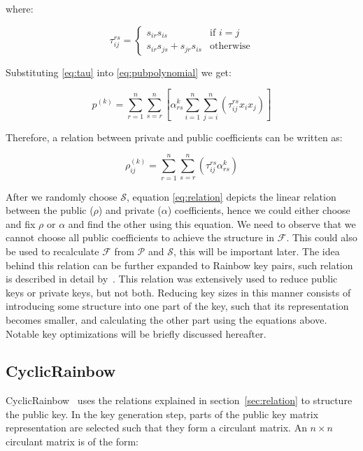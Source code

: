 \documentclass{ufsctex/ufsctex}
\begin{document}
where:

\begin{equation*}
\tau^{rs}_{ij} =
\begin{cases}
	s_{ir} s_{is} &\mbox{if } i=j \\
	s_{ir} s_{js} + s_{jr} s_{is} &\mbox{otherwise}
\end{cases}
\end{equation*}

Substituting \ref{eq:tau} into \ref{eq:pubpolynomial} we get:

\begin{equation}
p^{(k)} = \sum_{r=1}^n \sum_{s=r}^n
\left[
\alpha^{k}_{rs} \sum_{i=1}^{n}\sum_{j=i}^n \left( \tau^{rs}_{ij} x_i x_j \right)
\right]
\end{equation}

Therefore, a relation between private and public coefficients can be written as:

\begin{equation}\label{eq:relation}
\rho^{(k)}_{ij} = \sum_{r=1}^{n}\sum_{s=r}^n
\left( \tau^{rs}_{ij} \alpha^{k}_{rs} \right)
\end{equation}

After we randomly choose $\mathcal{S}$, equation \ref{eq:relation} depicts the
linear relation between the public ($\rho$) and private ($\alpha$)
coefficients, hence we could either choose and fix $\rho$ or $\alpha$ and find
the other using this equation. We need to observe that we cannot choose all
public coefficients to achieve the structure in $\mathcal{F}$. This could also
be used to recalculate $\mathcal{F}$ from $\mathcal{P}$ and $\mathcal{S}$, this
will be important later. The idea behind this relation can be further expanded
to Rainbow key pairs, such relation is described in detail
by~\cite{petzoldt2011small}. This relation was extensively used to reduce
public keys or private keys, but not both. Reducing key sizes in this manner
consists of introducing some structure into one part of the key, such that its
representation becomes smaller, and calculating the other part using the
equations above. Notable key optimizations will be briefly discussed hereafter.



\subsection{CyclicRainbow}

CyclicRainbow~\cite{petzoldt2010cyclicrainbow} uses the relations explained in
section~\ref{sec:relation} to structure the public key. In the key generation
step, parts of the public key matrix representation are selected such that they
form a circulant matrix. An $n \times n$ circulant matrix is of the form:
\end{document}
